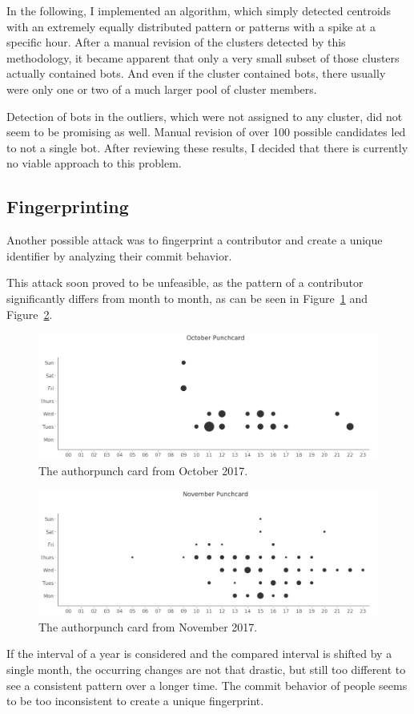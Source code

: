 In the following, I implemented an algorithm, which simply detected centroids with an extremely equally distributed pattern or patterns with a spike at a specific hour.
After a manual revision of the clusters detected by this methodology, it became apparent that only a very small subset of those clusters actually contained bots.
And even if the cluster contained bots, there usually were only one or two of a much larger pool of cluster members.

Detection of bots in the outliers, which were not assigned to any cluster, did not seem to be promising as well.
Manual revision of over 100 possible candidates led to not a single bot.
After reviewing these results, I decided that there is currently no viable approach to this problem.


\subsection{Fingerprinting}
Another possible attack was to fingerprint a contributor and create a unique identifier by analyzing their commit behavior.

This attack soon proved to be unfeasible, as the pattern of a contributor significantly differs from month to month, as can be seen in Figure~\ref{fig:october-punchcard} and Figure~\ref{fig:november-punchcard}.

\begin{figure}[H]
    \includegraphics[scale=0.32]{./graphs/analysis/october-punchcard}
    \centering
    \caption{The author\s punch card from October 2017.}\label{fig:october-punchcard}
\end{figure}

\begin{figure}[H]
    \includegraphics[scale=0.32]{./graphs/analysis/november-punchcard}
    \centering
    \caption{The author\s punch card from November 2017.}\label{fig:november-punchcard}
\end{figure}

If the interval of a year is considered and the compared interval is shifted by a single month, the occurring changes are not that drastic, but still too different to see a consistent pattern over a longer time.
The commit behavior of people seems to be too inconsistent to create a unique fingerprint.
